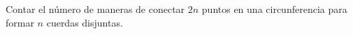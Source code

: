 \begin{statement}{26}
  Contar el n\'umero de maneras de conectar $2n$ puntos en una circunferencia
  para formar $n$ cuerdas disjuntas.
\end{statement}